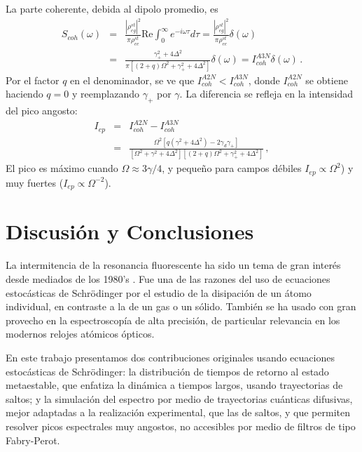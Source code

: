 \documentclass[superscriptaddress,12pt,amsmath]{revtex4-2}
\begin{document}
La parte coherente, debida al dipolo promedio, es 
%
\begin{eqnarray} 	\label{eq:ScohDef}
S_{coh}(\omega) &=& \frac{|\rho_{eg}^{st}|^2}{\pi \rho_{ee}^{st}} \mathrm{Re} 
	\int_0^{\infty}  e^{-i \omega \tau} d\tau 	
	= \frac{|\rho_{eg}^{st}|^2}{\pi \rho_{ee}^{st}}  \delta(\omega) \nonumber \\
&=& \frac{\gamma_+^2 +4 \Delta^2}
	{\pi \left[ (2+q)\Omega^2 +\gamma_+^2 +4 \Delta^2 \right] } \delta(\omega) 
	= I_{coh}^{A3N} \delta(\omega) \,. 	 
\end{eqnarray}
Por el factor $q$ en el denominador, se ve que 
$I_{coh}^{A2N} < I_{coh}^{A3N}$, donde $I_{coh}^{A2N}$ se obtiene 
haciendo $q=0$ y reemplazando $\gamma_+$ por $\gamma$. La 
diferencia se refleja en la intensidad del pico angosto:
%
\begin{eqnarray} 	
I_{ep} &=&  I_{coh}^{A2N} - I_{coh}^{A3N} 	\\
&=& \frac{ \Omega^2 \left[ q (\gamma^2 +4 \Delta^2) -2\gamma_d \gamma_+ \right] }
{ \left[ \Omega^2 +\gamma^2 +4 \Delta^2 \right] 
\left[ (2+q)\Omega^2 +\gamma_+^2 +4 \Delta^2 \right] }	\,,  \nonumber
\end{eqnarray}
 El pico es m\'aximo cuando  $\Omega \approx 3\gamma/4$, y peque\~no 
 para campos d\'ebiles $I_{ep} \propto \Omega^2$) y muy fuertes 
 ($I_{ep} \propto \Omega^{-2}$). 


\section{Discusi\'on y Conclusiones}
La intermitencia de la resonancia fluorescente ha sido un tema de gran 
inter\'es desde mediados de los 1980's \cite{PlKn98}. Fue una de las 
razones del uso de ecuaciones estoc\'asticas de Schr\"odinger por el 
estudio de la disipaci\'on de un \'atomo individual, en contraste a la de 
un gas o un s\'olido. Tambi\'en se ha usado con gran provecho en la 
espectroscop\'ia de alta precisi\'on, de particular relevancia en los 
modernos relojes at\'omicos \'opticos.   

En este trabajo presentamos dos contribuciones originales usando 
ecuaciones estoc\'asticas de Schr\"odinger: la distribuci\'on de tiempos 
de retorno al estado metaestable, que enfatiza la din\'amica a tiempos 
largos, usando trayectorias de saltos; y la simulaci\'on del espectro por 
medio de trayectorias cu\'anticas difusivas, mejor adaptadas a la 
realizaci\'on experimental, que las de saltos, y que permiten resolver 
picos espectrales muy angostos, no accesibles por medio de filtros de 
tipo Fabry-Perot.   
\end{document}
